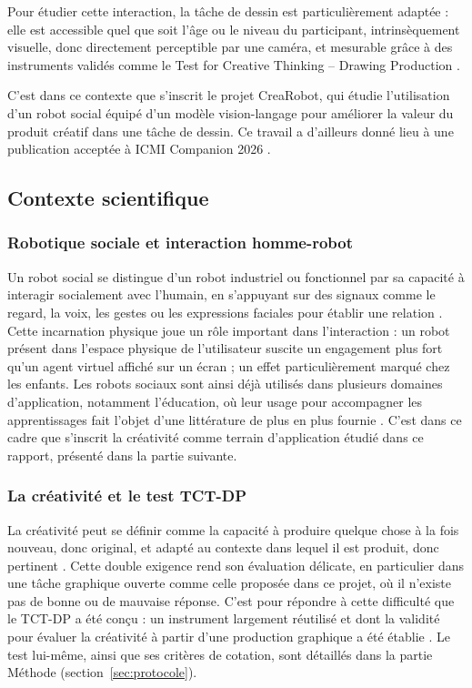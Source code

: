\documentclass[11pt]{article}
\begin{document}
Pour étudier cette interaction, la tâche de dessin est particulièrement adaptée : elle est accessible quel que soit l'âge ou le niveau du participant, intrinsèquement visuelle, donc directement perceptible par une caméra, et mesurable grâce à des instruments validés comme le Test for Creative Thinking – Drawing Production \cite{urban2005}.

C'est dans ce contexte que s'inscrit le projet CreaRobot, qui étudie l'utilisation d'un robot social équipé d'un modèle vision-langage pour améliorer la valeur du produit créatif dans une tâche de dessin. Ce travail a d'ailleurs donné lieu à une publication acceptée à ICMI Companion 2026 \cite{cuveillier2026crearobot}.

\subsection{Contexte scientifique}

\subsubsection{Robotique sociale et interaction homme-robot}

Un robot social se distingue d'un robot industriel ou fonctionnel par sa capacité à interagir socialement avec l'humain, en s'appuyant sur des signaux comme le regard, la voix, les gestes ou les expressions faciales pour établir une relation \cite{breazeal2004}. Cette incarnation physique joue un rôle important dans l'interaction : un robot présent dans l'espace physique de l'utilisateur suscite un engagement plus fort qu'un agent virtuel affiché sur un écran ; un effet particulièrement marqué chez les enfants. Les robots sociaux sont ainsi déjà utilisés dans plusieurs domaines d'application, notamment l'éducation, où leur usage pour accompagner les apprentissages fait l'objet d'une littérature de plus en plus fournie \cite{belpaeme2018,johal2020}. C'est dans ce cadre que s'inscrit la créativité comme terrain d'application étudié dans ce rapport, présenté dans la partie suivante.

\subsubsection{La créativité et le test TCT-DP}

La créativité peut se définir comme la capacité à produire quelque chose à la fois nouveau, donc original, et adapté au contexte dans lequel il est produit, donc pertinent \cite{lubart2003}. Cette double exigence rend son évaluation délicate, en particulier dans une tâche graphique ouverte comme celle proposée dans ce projet, où il n'existe pas de bonne ou de mauvaise réponse. C'est pour répondre à cette difficulté que le TCT-DP a été conçu : un instrument largement réutilisé et dont la validité pour évaluer la créativité à partir d'une production graphique a été établie \cite{urbanjellen1996,urban2005}. Le test lui-même, ainsi que ses critères de cotation, sont détaillés dans la partie Méthode (section~\ref{sec:protocole}).
\end{document}
